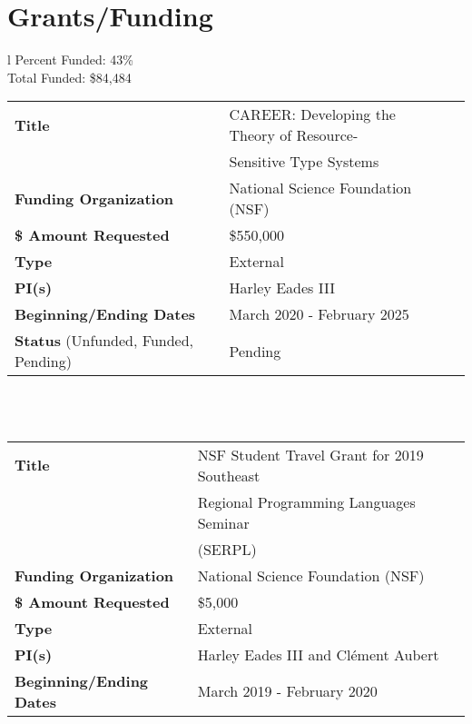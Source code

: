 \documentclass[11pt]{article}
\begin{document}
    \section{Grants/Funding}
    \label{subsec:funding_(awarded_grants)}
    \vspace{-10px}
    \begin{tabular}{l}
      Percent Funded: 43\%\\
      Total Funded: \$84,484\\
      \begin{tabular}{|l|l|l|}
          \hline
          \textbf{Title} & CAREER: Developing the Theory of Resource-\\
                         & Sensitive Type Systems \\
          \hline
          \textbf{Funding Organization} & National Science Foundation (NSF)\\
          \hline
          \textbf{\$ Amount Requested} & \$550,000\\
          \hline
          \textbf{Type} & External\\
          \hline
          \textbf{PI(s)} & Harley Eades III\\
          \hline
          \textbf{Beginning/Ending Dates} & March 2020 - February 2025\\
          \hline
          \textbf{Status} (Unfunded, Funded, Pending) & Pending\\
          \hline
        \end{tabular}\\
        \\
        \begin{tabular}{|l|l|l|}
          \hline
          \textbf{Title} & NSF Student Travel Grant for 2019 Southeast\,\,\,\\
          & Regional Programming Languages Seminar \\
          & (SERPL)\\
          \hline
          \textbf{Funding Organization} & National Science Foundation (NSF)\\
          \hline
          \textbf{\$ Amount Requested} & \$5,000\\
          \hline
          \textbf{Type} & External\\
          \hline
          \textbf{PI(s)} & Harley Eades III and Cl\'ement Aubert\\
          \hline
          \textbf{Beginning/Ending Dates} & March 2019 - February 2020\\

\end{tabular}
\end{tabular}
\end{document}
